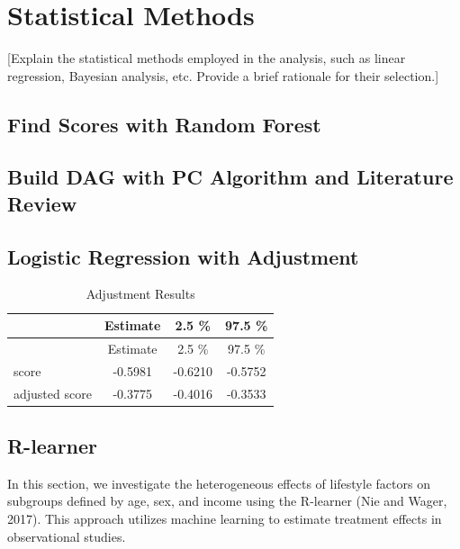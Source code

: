 \documentclass[
  12pt,
]{article}
\begin{document}
\hypertarget{statistical-methods}{%
\section{Statistical Methods}\label{statistical-methods}}

{[}Explain the statistical methods employed in the analysis, such as
linear regression, Bayesian analysis, etc. Provide a brief rationale for
their selection.{]}

\hypertarget{find-scores-with-random-forest}{%
\subsection{Find Scores with Random
Forest}\label{find-scores-with-random-forest}}

\hypertarget{build-dag-with-pc-algorithm-and-literature-review}{%
\subsection{Build DAG with PC Algorithm and Literature
Review}\label{build-dag-with-pc-algorithm-and-literature-review}}

\hypertarget{logistic-regression-with-adjustment}{%
\subsection{Logistic Regression with
Adjustment}\label{logistic-regression-with-adjustment}}

\begin{longtable}[]{@{}lccc@{}}
\caption{Adjustment Results}\tabularnewline
\toprule()
& Estimate & 2.5 \% & 97.5 \% \\
\midrule()
\endfirsthead
\toprule()
& Estimate & 2.5 \% & 97.5 \% \\
\midrule()
\endhead
score & -0.5981 & -0.6210 & -0.5752 \\
adjusted score & -0.3775 & -0.4016 & -0.3533 \\
\bottomrule()
\end{longtable}

\hypertarget{r-learner}{%
\subsection{R-learner}\label{r-learner}}

In this section, we investigate the heterogeneous effects of lifestyle
factors on subgroups defined by age, sex, and income using the R-learner
(Nie and Wager, 2017). This approach utilizes machine learning to
estimate treatment effects in observational studies.
\end{document}
